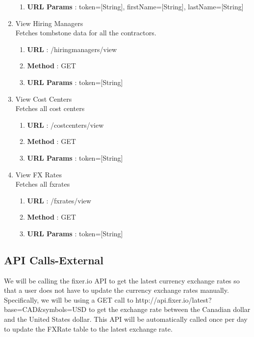 \documentclass[11pt, titlepage]{article}
\begin{document}
\begin{enumerate}
\begin{enumerate}
                    \item \textbf{URL Params} : token=[String], firstName=[String], lastName=[String]
                \end{enumerate}
        \item View Hiring Managers \\
             Fetches tombstone data for all the contractors.
                \begin{enumerate}
                    \item \textbf{URL} : /hiringmanagers/view
                    \item \textbf{Method} : GET
                    \item \textbf{URL Params} : token=[String]
                \end{enumerate}
        \item View Cost Centers \\
             Fetches all cost centers
                \begin{enumerate}
                    \item \textbf{URL} : /costcenters/view
                    \item \textbf{Method} : GET
                    \item \textbf{URL Params} : token=[String]
                \end{enumerate}
        \item View FX Rates \\
             Fetches all fxrates
                \begin{enumerate}
                    \item \textbf{URL} : /fxrates/view
                    \item \textbf{Method} : GET
                    \item \textbf{URL Params} : token=[String]
                \end{enumerate}
\end{enumerate}

\subsection{API Calls-External}

We will be calling the fixer.io API to get the latest currency exchange rates so that a user does not have to update the currency exchange rates manually. Specifically, we will be using a GET call to http://api.fixer.io/latest?base=CAD\&symbols=USD to get the exchange rate between the Canadian dollar and the United States dollar. This API will be automatically called once per day to update the FXRate table to the latest exchange rate. 
\end{document}
